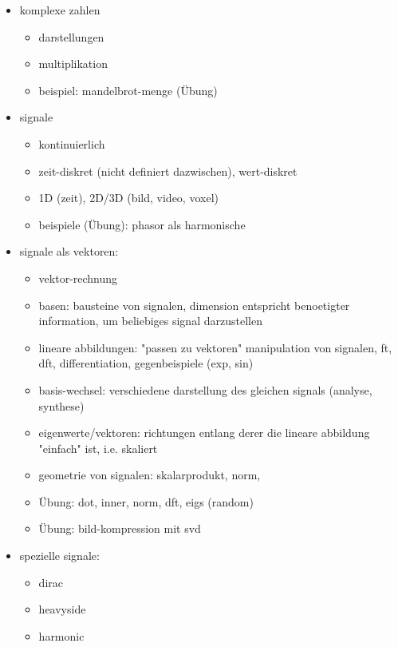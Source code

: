 \begin{itemize}
    \item komplexe zahlen
        \begin{itemize}
            \item darstellungen
            \item multiplikation
            \item beispiel: mandelbrot-menge (\"Ubung)
        \end{itemize}
    \item signale
        \begin{itemize}
            \item kontinuierlich
            \item zeit-diskret (nicht definiert dazwischen), wert-diskret
            \item 1D (zeit), 2D/3D (bild, video, voxel)
            \item beispiele (\"Ubung): phasor als harmonische
        \end{itemize}
    \item signale als vektoren: 
        \begin{itemize}
            \item vektor-rechnung
            \item basen: bausteine von signalen, dimension entspricht benoetigter information, um beliebiges signal darzustellen
            \item lineare abbildungen: "passen zu vektoren" manipulation von signalen, \gls{ft}, \gls{dft}, differentiation, gegenbeispiele (exp, sin)
            \item basis-wechsel: verschiedene darstellung des gleichen signals (analyse, synthese)
            \item eigenwerte/vektoren: richtungen entlang derer die lineare abbildung "einfach" ist, i.e. skaliert
            \item geometrie von signalen: skalarprodukt, norm, 
            \item \"Ubung: dot, inner, norm, dft, eigs (random)
            \item \"Ubung: bild-kompression mit svd
        \end{itemize}
    \item spezielle signale:
    \begin{itemize}
        \item dirac
        \item heavyside
        \item harmonic

\end{itemize}
\end{itemize}
